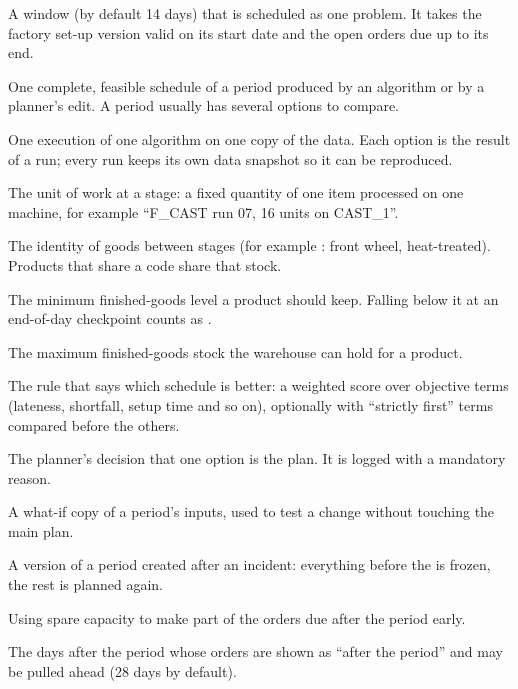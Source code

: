 \begin{description}[style=nextline, leftmargin=1.2em, font=\bfseries\color{brand}]
  \item[Planning period] A window (by default 14 days) that is scheduled as one problem. It takes the factory
        set-up version valid on its start date and the open orders due up to its end.
  \item[Option / schedule] One complete, feasible schedule of a period produced by an algorithm or by a
        planner's edit. A period usually has several options to compare.
  \item[Run (solver run)] One execution of one algorithm on one copy of the data. Each option is the result of
        a run; every run keeps its own data snapshot so it can be reproduced.
  \item[Run (production run)] The unit of work at a stage: a fixed quantity of one item processed on one
        machine, for example ``F\_CAST run 07, 16 units on CAST\_1''.
  \item[Semi-finished code] The identity of goods between stages (for example : front wheel,
        heat-treated). Products that share a code share that stock.
  \item[Safety stock] The minimum finished-goods level a product should keep. Falling below it at an
        end-of-day checkpoint counts as .
  \item[Stock cap] The maximum finished-goods stock the warehouse can hold for a product.
  \item[Policy] The rule that says which schedule is better: a weighted score over objective terms (lateness,
        shortfall, setup time and so on), optionally with ``strictly first'' terms compared before the others.
  \item[Commit] The planner's decision that one option is the plan. It is logged with a mandatory reason.
  \item[Variant] A what-if copy of a period's inputs, used to test a change without touching the main plan.
  \item[Reschedule] A version of a period created after an incident: everything before the 
        is frozen, the rest is planned again.
  \item[Pull-ahead (build-ahead)] Using spare capacity to make part of the orders due after the period early.
  \item[Look-ahead window] The days after the period whose orders are shown as ``after the period'' and may
        be pulled ahead (28 days by default).
\end{description}

